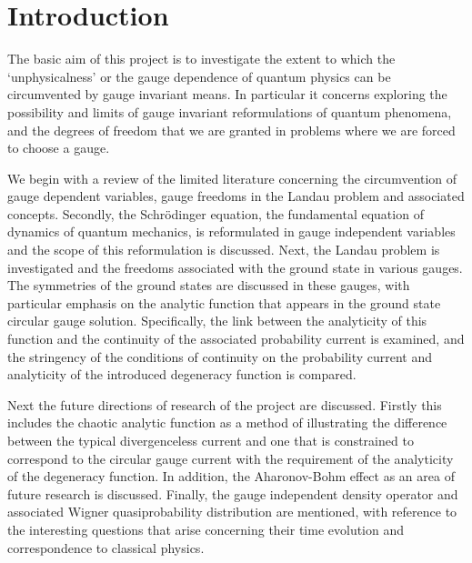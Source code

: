 \section{Introduction}
\label{sec:introduction}

The basic aim of this project is to investigate the extent to which the
`unphysicalness' or the gauge dependence of quantum physics can be circumvented
by gauge invariant means. In particular it concerns exploring the possibility
and limits of gauge invariant reformulations of quantum phenomena, and the
degrees of freedom that we are granted in problems where we are forced to choose
a gauge.

We begin with a review of the limited literature concerning the circumvention of
gauge dependent variables, gauge freedoms in the Landau problem and associated
concepts. Secondly, the Schr\"odinger equation, the fundamental equation of
dynamics of quantum mechanics, is reformulated in gauge independent variables
and the scope of this reformulation is discussed. Next, the Landau problem is
investigated and the freedoms associated with the ground state in various
gauges. The symmetries of the ground states are discussed in these gauges, with
particular emphasis on the analytic function that appears in the ground state
circular gauge solution. Specifically, the link between the analyticity of this
function and the continuity of the associated probability current is examined,
and the stringency of the conditions of continuity on the probability current
and analyticity of the introduced degeneracy function is compared.

Next the future directions of research of the project are discussed. Firstly
this includes the chaotic analytic function as a method of illustrating the
difference between the typical divergenceless current and one that is
constrained to correspond to the circular gauge current with the requirement of
the analyticity of the degeneracy function. In addition, the Aharonov-Bohm
effect as an area of future research is discussed. Finally, the gauge
independent density operator and associated Wigner quasiprobability distribution
are mentioned, with reference to the interesting questions that arise concerning
their time evolution and correspondence to classical physics.
